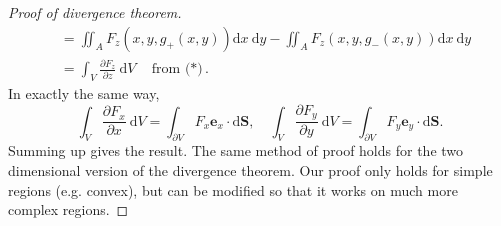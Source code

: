 \begin{proof}[Proof of divergence theorem]
\begin{align*}
        &=\iint_{A} F_{z}\left(x, y, g_{+}(x, y)\right) \mathrm{d} x \mathrm{~d} y-\iint_{A} F_{z}\left(x, y, g_{-}(x, y)\right) \mathrm{d} x \mathrm{~d} y \\
        &=\int_{V} \frac{\partial F_{z}}{\partial z} \mathrm{~d} V\quad \text{from ($*$)} .
    \end{align*}
    In exactly the same way, 
    \[
        \int_{V} \frac{\partial F_{x}}{\partial x} \mathrm{~d} V=\int_{\partial V} F_{x} \mathbf{e}_{x} \cdot \mathrm{d} \mathbf{S}, \quad \int_{V} \frac{\partial F_{y}}{\partial y} \mathrm{~d} V=\int_{\partial V} F_{y} \mathbf{e}_{y} \cdot \mathrm{d} \mathbf{S} .
    \]
    Summing up gives the result. The same method of proof holds for the two dimensional version of the divergence theorem. Our proof only holds for simple regions (e.g. convex), but can be modified so that it works on much more complex regions.
\end{proof}

